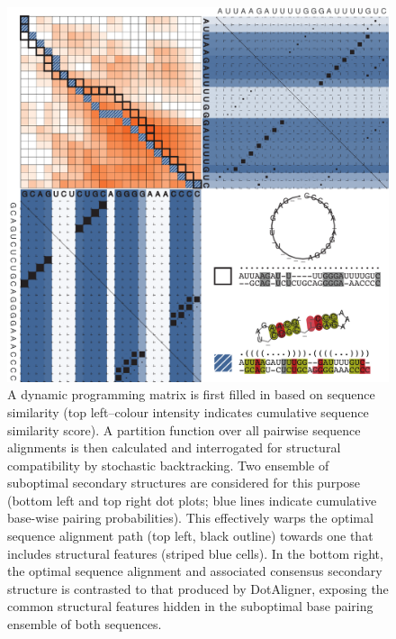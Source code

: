 \documentclass{bmcart}
\begin{document}
\begin{backmatter}
\begin{figure}[h!]
\includegraphics[width=\textwidth]{fig1}
 \caption {
  A dynamic  programming matrix is first filled in based on sequence 
  similarity (top left--colour intensity indicates cumulative sequence similarity score). 
  A partition function over all pairwise sequence alignments is then calculated and 
  interrogated for structural compatibility by stochastic backtracking. 
  Two ensemble of suboptimal secondary structures are considered for this purpose
  (bottom left and top right dot plots; blue lines indicate cumulative base-wise pairing probabilities). This effectively warps the optimal  sequence alignment path (top left, black outline) towards one that includes structural features (striped blue cells).  In the bottom right, the optimal sequence alignment
  and associated consensus secondary structure is contrasted to that produced 
  by DotAligner, exposing the common structural features hidden in the suboptimal 
  base pairing ensemble of both sequences. 
 }
\end{figure}



\end{backmatter}
\end{document}
